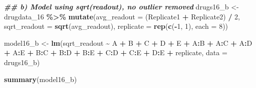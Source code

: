 \documentclass[
]{article}
\newenvironment{Shaded}{\begin{snugshade}}{\end{snugshade}}
\newcommand{\AttributeTok}[1]{\textcolor[rgb]{0.13,0.29,0.53}{#1}}
\newcommand{\DecValTok}[1]{\textcolor[rgb]{0.00,0.00,0.81}{#1}}
\newcommand{\DocumentationTok}[1]{\textcolor[rgb]{0.56,0.35,0.01}{\textbf{\textit{#1}}}}
\newcommand{\FunctionTok}[1]{\textcolor[rgb]{0.13,0.29,0.53}{\textbf{#1}}}
\newcommand{\NormalTok}[1]{#1}
\newcommand{\OtherTok}[1]{\textcolor[rgb]{0.56,0.35,0.01}{#1}}
\newcommand{\SpecialCharTok}[1]{\textcolor[rgb]{0.81,0.36,0.00}{\textbf{#1}}}
\begin{document}
\begin{Shaded}
\begin{Highlighting}[]
\DocumentationTok{\#\# b) Model using sqrt(readout), no outlier removed}
\NormalTok{drugs16\_b }\OtherTok{\textless{}{-}}\NormalTok{ drugdata\_16 }\SpecialCharTok{\%\textgreater{}\%}
  \FunctionTok{mutate}\NormalTok{(}\AttributeTok{avg\_readout =}\NormalTok{ (Replicate1 }\SpecialCharTok{+}\NormalTok{ Replicate2) }\SpecialCharTok{/} \DecValTok{2}\NormalTok{,}
         \AttributeTok{sqrt\_readout =} \FunctionTok{sqrt}\NormalTok{(avg\_readout),}
         \AttributeTok{replicate =} \FunctionTok{rep}\NormalTok{(}\FunctionTok{c}\NormalTok{(}\SpecialCharTok{{-}}\DecValTok{1}\NormalTok{, }\DecValTok{1}\NormalTok{), }\AttributeTok{each =} \DecValTok{8}\NormalTok{))}

\NormalTok{model16\_b }\OtherTok{\textless{}{-}} \FunctionTok{lm}\NormalTok{(sqrt\_readout }\SpecialCharTok{\textasciitilde{}}\NormalTok{ A }\SpecialCharTok{+}\NormalTok{ B }\SpecialCharTok{+}\NormalTok{ C }\SpecialCharTok{+}\NormalTok{ D }\SpecialCharTok{+}\NormalTok{ E }\SpecialCharTok{+}
\NormalTok{                  A}\SpecialCharTok{:}\NormalTok{B }\SpecialCharTok{+}\NormalTok{ A}\SpecialCharTok{:}\NormalTok{C }\SpecialCharTok{+}\NormalTok{ A}\SpecialCharTok{:}\NormalTok{D }\SpecialCharTok{+}\NormalTok{ A}\SpecialCharTok{:}\NormalTok{E }\SpecialCharTok{+}
\NormalTok{                  B}\SpecialCharTok{:}\NormalTok{C }\SpecialCharTok{+}\NormalTok{ B}\SpecialCharTok{:}\NormalTok{D }\SpecialCharTok{+}\NormalTok{ B}\SpecialCharTok{:}\NormalTok{E }\SpecialCharTok{+}
\NormalTok{                  C}\SpecialCharTok{:}\NormalTok{D }\SpecialCharTok{+}\NormalTok{ C}\SpecialCharTok{:}\NormalTok{E }\SpecialCharTok{+}\NormalTok{ D}\SpecialCharTok{:}\NormalTok{E }\SpecialCharTok{+}
\NormalTok{                  replicate,}
                \AttributeTok{data =}\NormalTok{ drugs16\_b)}

\FunctionTok{summary}\NormalTok{(model16\_b)}
\end{Highlighting}
\end{Shaded}
\end{document}
